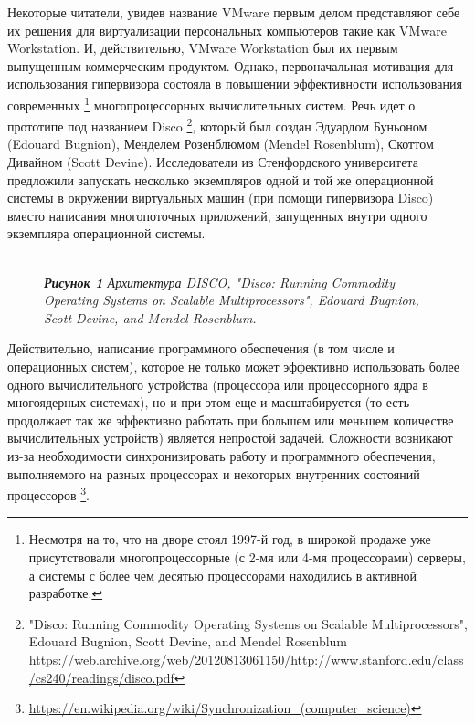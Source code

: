 \documentclass[14pt, a4paper]{article}
\begin{document}
Некоторые читатели, увидев название VMware первым делом представляют себе их
решения для виртуализации персональных компьютеров такие как VMware
Workstation. И, действительно, VMware Workstation был их первым выпущенным
коммерческим продуктом. Однако, первоначальная мотивация для использования
гипервизора состояла в повышении эффективности использования современных \footnote{Несмотря на то, что на дворе стоял 1997-й год, в широкой продаже уже присутствовали
многопроцессорные (с 2-мя или 4-мя процессорами) серверы, а системы с более чем десятью
процессорами находились в активной разработке.}
многопроцессорных вычислительных систем. Речь идет о прототипе под названием
Disco \footnote{"Disco: Running Commodity Operating Systems on Scalable Multiprocessors",
Edouard Bugnion, Scott Devine, and Mendel Rosenblum \\ \href{https://web.archive.org/web/20120813061150/http://www.stanford.edu/class/cs240/readings/disco.pdf}{https://web.archive.org/web/20120813061150/http://www.stanford.edu/class/cs240/readings/disco.pdf}}, который был создан Эдуардом Буньоном (Edouard Bugnion), Менделем
Розенблюмом (Mendel Rosenblum), Скоттом Дивайном (Scott Devine). Исследователи из
Стенфордского университета предложили запускать несколько экземпляров одной и
той же операционной системы в окружении виртуальных машин (при помощи
гипервизора Disco) вместо написания многопоточных приложений, запущенных внутри
одного экземпляра операционной системы.

\begin{figure}[h]
    \centering
    \\
    \small\textit{\textbf{Рисунок 1} Архитектура DISCO, "Disco: Running Commodity Operating Systems on Scalable Multiprocessors",
    Edouard Bugnion, Scott Devine, and Mendel Rosenblum.}
    \label{framework} 
\end{figure}

Действительно, написание программного обеспечения (в том числе и операционных
систем), которое не только может эффективно использовать более одного
вычислительного устройства (процессора или процессорного ядра в многоядерных
системах), но и при этом еще и масштабируется (то есть продолжает так же
эффективно работать при большем или меньшем количестве вычислительных
устройств) является непростой задачей. Сложности возникают из-за необходимости
синхронизировать работу и программного обеспечения, выполняемого на разных
процессорах и некоторых внутренних состояний процессоров \footnote{\href{https://en.wikipedia.org/wiki/Synchronization_(computer_science)}{https://en.wikipedia.org/wiki/Synchronization\_(computer\_science)}}.\\
\end{document}
